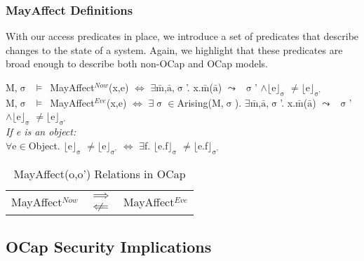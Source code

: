 \documentclass[a4paper,11pt, twoside,twocolumn]{article}
\newenvironment{logic}[1][null]
{\begin{flushleft} \small \label{#1}}
{\end{flushleft}}
\newcommand{\loin}{$\in$}
\newcommand{\loforall}{$\forall$}
\newcommand{\loexists}{$\exists$}
\newcommand{\loand}{$\land$}
\newcommand{\loneq} {$\neq$}
\newcommand{\loimplies}{$\implies$}
\newcommand{\lonimpliedby}{$\centernot\Longleftarrow$}
\newcommand{\losigma}{$\upsigma$}
\newcommand{\loturns} {$\vDash$}
\newcommand{\loiff} {$\iff$}
\newcommand{\loleadsto} {$\leadsto$}
\newcommand{\loexec}[2] {$\lfloor$#1$\rfloor _{\text{#2}}$}
\newcommand{\loconj}[1] {$\bar{\text{#1}}$}
\newcommand{\ablock} {\null\qquad}
\begin{document}
\subsubsection{MayAffect Definitions}
With our access predicates in place, we introduce a set of predicates that describe changes to the state of a system. Again, we highlight that these predicates are broad enough to describe both non-OCap and OCap models. 
\begin{logic}
M,\losigma\ \loturns\ MayAffect$^{Now}$(x,e) \loiff \linebreak
\ablock \loexists \loconj{m},\loconj{a},\losigma'. x.\loconj{m}(\loconj{a}) \loleadsto\ \losigma' \loand \loexec{e}{\losigma} \loneq \loexec{e}{\losigma'}
\linebreak \\
M,\losigma\ \loturns\ MayAffect$^{Eve}$(x,e) \loiff \linebreak
\ablock \loexists \losigma \loin Arising(M,\losigma).\linebreak
\ablock \loexists \loconj{m},\loconj{a},\losigma'. x.\loconj{m}(\loconj{a}) \loleadsto\ \losigma' \loand \loexec{e}{\losigma} \loneq \loexec{e}{\losigma'}
\linebreak \\
\textit{If e is an object:} \\
\loforall e\loin Object. \loexec{e}{\losigma} \loneq \loexec{e}{\losigma'} \loiff \linebreak
\ablock \loexists f. \loexec{e.f}{\losigma} \loneq \loexec{e.f}{\losigma'}
\end{logic}

\begin{table}[hbtp]
\caption{MayAffect(o,o') Relations in OCap}
\centering
\begin{tabular*}{\linewidth}{ccc}\toprule
\multirow{2}{*}{MayAffect$^{Now}$} & \loimplies & \multirow{2}{*}{MayAffect$^{Eve}$} \\
& \lonimpliedby &  \\
\bottomrule
\end{tabular*}
\end{table}

\subsection{OCap Security Implications}
\end{document}
